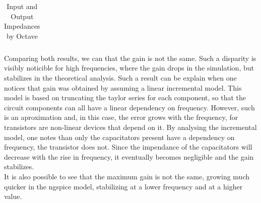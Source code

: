 %    

\FloatBarrier
\begin{table}[h]
  \centering
  \begin{tabular}{|c|c|c|c|}
    \hline    
    
    \hline
  \end{tabular}
  \caption{Input and Output Impedances by Octave}
  \label{tab:Spice1}
\end{table}
\FloatBarrier   


Comparing both results, we can that the gain is not the same. Such a disparity is visibly noticible for high frequencies, where the gain drops in the simulation, but stabilizes in the theoretical analysis. Such a result can be explain when one notices that gain was obtained by assuming a linear incremental model. This model is based on truncating the taylor series for each component, so that the circuit components can all have a linear dependency on frequency. However, such is an aproximation and, in this case, the error grows with the frequency, for transistors are non-linear devices that depend on it. By analysing the incremental model, one notes than only the capacitators present have a dependency on frequency, the transistor does not. Since the impendance of the capacitators will decrease with the rise in frequency, it eventually becomes negligible and the gain stabilizes.\\
It is also possible to see that the maximum gain is not the same, growing much quicker in the ngspice model, stabilizing at a lower frequency and at a higher value.\\





